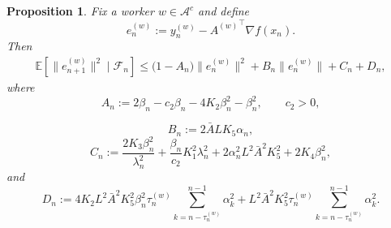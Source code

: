 \documentclass[10pt,a4paper]{amsart}
\newtheorem{proposition}{Proposition}
\begin{document}
\begin{proposition}
\label{prop:enbound}
Fix a worker $w \in \mathcal{A}^c$ and define
\[
e_n^{(w)} := y_n^{(w)} - {A^{(w)}}^\top \nabla f(x_n).
\]
Then
\begin{equation}
\begin{split}
\mathbb{E}\!\left[\|e_{n+1}^{(w)}\|^2 \mid \mathcal{F}_n\right]
\le
\big(1 - A_n\big)\|e_n^{(w)}\|^2
+ B_n \|e_n^{(w)}\|
+ C_n + D_n,
\end{split}
\label{18eq}
\end{equation}
where
\[
A_n := 2\beta_n - c_2 \beta_n - 4 K_2 \beta_n^2 - \beta_n^2, \qquad c_2>0,
\] 

\[
B_n := 2 \bar{A} L K_5 \alpha_n,
\]
\[
C_n :=
\frac{2K_3 \beta_n^2}{\lambda_n^2}
+ \frac{\beta_n}{c_2} K_1^2 \lambda_n^2
+ 2\alpha_n^2 L^2 \bar{A}^2 K_5^2
+ 2K_4 \beta_n^2,
\]
and
\[
D_n :=
4 K_2 L^2 \bar{A}^2 K_5^2 \beta_n^2 \tau_n^{(w)}
\sum_{k=n-\tau_n^{(w)}}^{n-1} \alpha_k^2
+ L^2 \bar{A}^2 K_5^2 \tau_n^{(w)}
\sum_{k=n-\tau_n^{(w)}}^{n-1} \alpha_k^2.
\]
\end{proposition}
\end{document}
